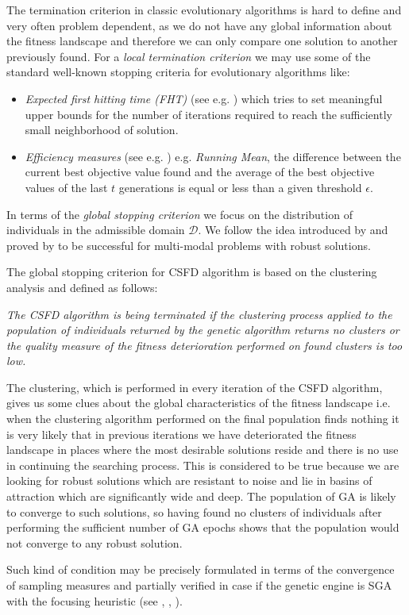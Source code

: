 The termination criterion in classic evolutionary algorithms is hard to
define and very often problem dependent, as we do not
have any global information about the fitness landscape and therefore we can only 
compare one solution to another previously found.
For a \textit{local termination criterion} we may use some of the 
standard well-known stopping criteria for evolutionary algorithms like: 

\begin{itemize}
  
  \item 
  \textit{Expected first hitting time (FHT)} (see e.g. \cite{PardalosRomeijn2002})
  which tries to set meaningful upper bounds for the number of iterations 
  required to reach the sufficiently small neighborhood of solution.
  
  \item 
  \textit{Efficiency measures} (see e.g. \cite{Goldberg1989}) 
  e.g. \textit{Running Mean}, the difference between the current 
  best objective value found and the average of the best objective 
	values of the last $t$ generations is equal or less than a given threshold
	$\epsilon$. 
	 
\end{itemize}

In terms of the \textit{global stopping criterion} we  
focus on the distribution of individuals
in the admissible domain $\mathcal{D}$. 
We follow the idea introduced by \cite{Telega1999}
and proved by \cite{SchaeferAdamska2004} 
to be successful for multi-modal problems with robust solutions.


The global stopping criterion for CSFD algorithm is based on the clustering analysis 
and defined as follows:

\vspace{5pt}
\noindent
\textit{The CSFD algorithm is being terminated if the clustering process applied to
the population of individuals returned by the genetic algorithm
returns no clusters or the quality measure of the fitness
deterioration performed on found clusters is too low.}
\vspace{5pt}

The clustering, which is performed in every iteration of the CSFD algorithm,
gives us some clues about the global characteristics of the fitness landscape 
i.e. when the clustering  algorithm performed on the final population finds
nothing it is very likely that in previous iterations we have deteriorated the fitness landscape in places where the most desirable solutions reside and there is no use in
continuing the searching process.
This is considered to be true because we are looking for robust solutions which are resistant to noise and lie in basins of attraction which are significantly wide and deep.
The population of GA is likely to converge to such solutions, so
having found no clusters of individuals after performing 
the sufficient number of GA epochs  
shows that the population would not converge to any robust solution.

Such kind of condition may be precisely formulated in terms of the convergence
of sampling measures and partially verified in case if the genetic engine
is SGA with the focusing heuristic (see \cite{Telega1999},
\cite{Schaefer2007}, \cite{SchaeferJablonski2001}).
